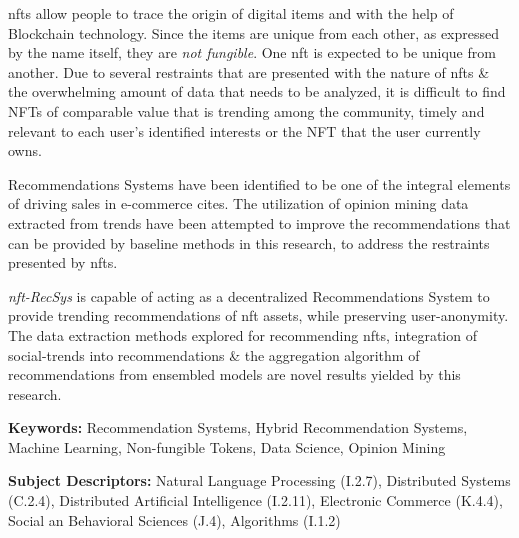 
\gls{nft}s allow people to trace the origin of digital items and with the help of Blockchain technology. Since the items are unique from each other, as expressed by the name itself, they are \textit{not fungible}. One \gls{nft} is expected to be unique from another. 
Due to several restraints that are presented with the nature of \gls{nft}s \& the overwhelming amount of data that needs to be analyzed, it is difficult to find NFTs of comparable value that is trending among the community, timely and relevant to each user’s identified interests or the NFT that the user currently owns.

Recommendations Systems have been identified to be one of the integral elements of driving sales in e-commerce cites. The utilization of opinion mining data extracted from trends have been attempted to improve the recommendations that can be provided by baseline methods in this research, to address the restraints presented by \gls{nft}s.

\textit{\gls{nft}-RecSys} is capable of acting as a decentralized Recommendations System to provide trending recommendations of \gls{nft} assets, while preserving user-anonymity. The data extraction methods explored for recommending \gls{nft}s, integration of social-trends into recommendations \& the aggregation algorithm of recommendations from ensembled models are novel results yielded by this research.

\bigbreak
\noindent\textbf{Keywords:} Recommendation Systems, Hybrid Recommendation Systems, Machine Learning, Non-fungible Tokens, Data Science, Opinion Mining

\bigbreak
\noindent\textbf{Subject Descriptors:}
Natural Language Processing (I.2.7),  Distributed Systems (C.2.4), Distributed Artificial Intelligence (I.2.11), Electronic Commerce (K.4.4), Social an Behavioral Sciences (J.4), Algorithms (I.1.2)